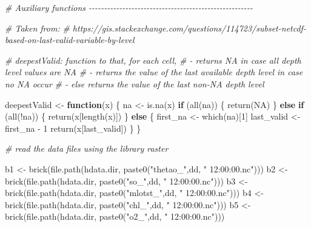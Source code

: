 \documentclass[
]{book}
\newenvironment{Shaded}{\begin{snugshade}}{\end{snugshade}}
\newcommand{\CommentTok}[1]{\textcolor[rgb]{0.56,0.35,0.01}{\textit{#1}}}
\newcommand{\ConstantTok}[1]{\textcolor[rgb]{0.00,0.00,0.00}{#1}}
\newcommand{\ControlFlowTok}[1]{\textcolor[rgb]{0.13,0.29,0.53}{\textbf{#1}}}
\newcommand{\DecValTok}[1]{\textcolor[rgb]{0.00,0.00,0.81}{#1}}
\newcommand{\FunctionTok}[1]{\textcolor[rgb]{0.00,0.00,0.00}{#1}}
\newcommand{\NormalTok}[1]{#1}
\newcommand{\OtherTok}[1]{\textcolor[rgb]{0.56,0.35,0.01}{#1}}
\newcommand{\SpecialCharTok}[1]{\textcolor[rgb]{0.00,0.00,0.00}{#1}}
\newcommand{\StringTok}[1]{\textcolor[rgb]{0.31,0.60,0.02}{#1}}
\begin{document}
\begin{Shaded}
\begin{Highlighting}[]
\CommentTok{\# Auxiliary functions {-}{-}{-}{-}{-}{-}{-}{-}{-}{-}{-}{-}{-}{-}{-}{-}{-}{-}{-}{-}{-}{-}{-}{-}{-}{-}{-}{-}{-}{-}{-}{-}{-}{-}{-}{-}{-}{-}{-}{-}{-}{-}{-}{-}{-}{-}{-}{-}{-}{-}{-}{-}{-}{-}}

\CommentTok{\# Taken from: }
\CommentTok{\# https://gis.stackexchange.com/questions/114723/subset{-}netcdf{-}based{-}on{-}last{-}valid{-}variable{-}by{-}level}

\CommentTok{\# deepestValid: function to that, for each cell,  }
\CommentTok{\# {-} returns NA in case all depth level values are NA}
\CommentTok{\# {-} returns the value of the last available depth level in case no NA occur}
\CommentTok{\# {-} else returns the value of the last non{-}NA depth level}

\NormalTok{deepestValid }\OtherTok{\textless{}{-}} \ControlFlowTok{function}\NormalTok{(x) \{}
\NormalTok{  na }\OtherTok{\textless{}{-}} \FunctionTok{is.na}\NormalTok{(x)}
  \ControlFlowTok{if}\NormalTok{ (}\FunctionTok{all}\NormalTok{(na)) \{}
    \FunctionTok{return}\NormalTok{(}\ConstantTok{NA}\NormalTok{)}
\NormalTok{  \} }\ControlFlowTok{else} \ControlFlowTok{if}\NormalTok{ (}\FunctionTok{all}\NormalTok{(}\SpecialCharTok{!}\NormalTok{na)) \{}
    \FunctionTok{return}\NormalTok{(x[}\FunctionTok{length}\NormalTok{(x)])}
\NormalTok{  \} }\ControlFlowTok{else}\NormalTok{ \{}
\NormalTok{    first\_na }\OtherTok{\textless{}{-}} \FunctionTok{which}\NormalTok{(na)[}\DecValTok{1}\NormalTok{]}
\NormalTok{    last\_valid }\OtherTok{\textless{}{-}}\NormalTok{ first\_na }\SpecialCharTok{{-}} \DecValTok{1}
    \FunctionTok{return}\NormalTok{(x[last\_valid])}
\NormalTok{  \}}
\NormalTok{\}}

\CommentTok{\# read the data files using the library raster}

\NormalTok{b1 }\OtherTok{\textless{}{-}} \FunctionTok{brick}\NormalTok{(}\FunctionTok{file.path}\NormalTok{(hdata.dir, }\FunctionTok{paste0}\NormalTok{(}\StringTok{"thetao\_"}\NormalTok{,dd, }\StringTok{" 12:00:00.nc"}\NormalTok{)))}
\NormalTok{b2 }\OtherTok{\textless{}{-}} \FunctionTok{brick}\NormalTok{(}\FunctionTok{file.path}\NormalTok{(hdata.dir, }\FunctionTok{paste0}\NormalTok{(}\StringTok{"so\_"}\NormalTok{,dd, }\StringTok{" 12:00:00.nc"}\NormalTok{)))}
\NormalTok{b3 }\OtherTok{\textless{}{-}} \FunctionTok{brick}\NormalTok{(}\FunctionTok{file.path}\NormalTok{(hdata.dir, }\FunctionTok{paste0}\NormalTok{(}\StringTok{"mlotst\_"}\NormalTok{,dd, }\StringTok{" 12:00:00.nc"}\NormalTok{)))}
\NormalTok{b4 }\OtherTok{\textless{}{-}} \FunctionTok{brick}\NormalTok{(}\FunctionTok{file.path}\NormalTok{(hdata.dir, }\FunctionTok{paste0}\NormalTok{(}\StringTok{"chl\_"}\NormalTok{,dd, }\StringTok{" 12:00:00.nc"}\NormalTok{)))}
\NormalTok{b5 }\OtherTok{\textless{}{-}} \FunctionTok{brick}\NormalTok{(}\FunctionTok{file.path}\NormalTok{(hdata.dir, }\FunctionTok{paste0}\NormalTok{(}\StringTok{"o2\_"}\NormalTok{,dd, }\StringTok{" 12:00:00.nc"}\NormalTok{))) }


\end{Highlighting}
\end{Shaded}
\end{document}
